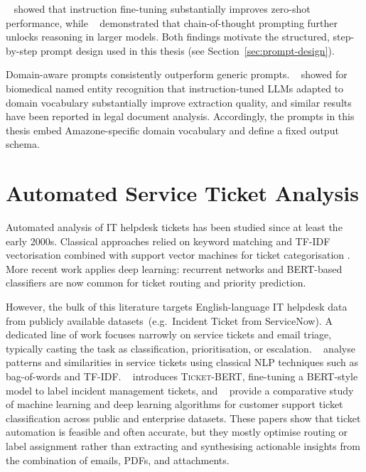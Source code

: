 \citeauthor{wei2022finetuned}~\cite{wei2022finetuned} showed that instruction
fine-tuning substantially improves zero-shot performance, while
\citeauthor{kojima2022large}~\cite{kojima2022large} demonstrated that chain-of-thought
prompting further unlocks reasoning in larger models.  Both findings motivate the
structured, step-by-step prompt design used in this thesis
(see Section~\ref{sec:prompt-design}).

Domain-aware prompts consistently outperform generic prompts.
\citeauthor{keloth2024advancing}~\cite{keloth2024advancing} showed for biomedical
named entity recognition that instruction-tuned LLMs adapted to domain vocabulary
substantially improve extraction quality, and similar results have been reported
in legal document analysis.
Accordingly, the prompts in this thesis embed Amazone-specific domain vocabulary and
define a fixed output schema.

\section{Automated Service Ticket Analysis}
\label{sec:rw-tickets}
%
Automated analysis of IT helpdesk tickets has been studied since at least the
early 2000s.  Classical approaches relied on keyword matching and TF-IDF
vectorisation combined with support vector machines for ticket categorisation
\cite{yang1999reevaluation}.  More recent work applies deep learning: recurrent
networks \cite{hochreiter1997long} and BERT-based classifiers are now common for
ticket routing and priority prediction.

However, the bulk of this literature targets English-language IT helpdesk data
from publicly available datasets~(e.g.~Incident Ticket from ServiceNow).
A dedicated line of work focuses narrowly on service tickets and email triage,
typically casting the task as classification, prioritisation, or escalation.
\citeauthor{tolciu2021analysis}~\cite{tolciu2021analysis} analyse patterns and
similarities in service tickets using classical NLP techniques such as
bag-of-words and TF-IDF.  \citeauthor{liu2023ticketbert}~\cite{liu2023ticketbert}
introduces \textsc{Ticket-BERT}, fine-tuning a BERT-style model to label incident
management tickets, and \citeauthor{boonklay2025comparative}~%
\cite{boonklay2025comparative} provide a comparative study of machine learning
and deep learning algorithms for customer support ticket classification across
public and enterprise datasets.  These papers show that ticket automation is
feasible and often accurate, but they mostly optimise routing or label
assignment rather than extracting and synthesising actionable insights from the
combination of emails, PDFs, and attachments.

